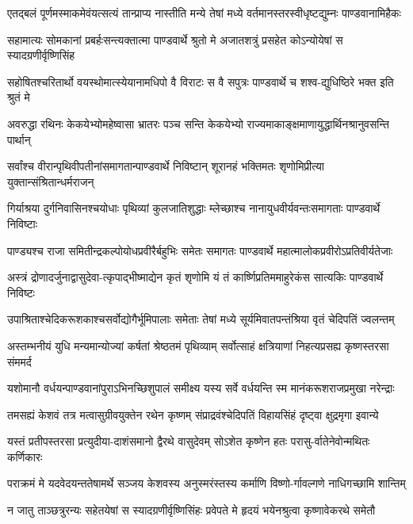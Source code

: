 \twolineshloka
{एतद्बलं पूर्णमस्माकमेवंयत्सत्यं तान्प्राप्य नास्तीति मन्ये}
{तेषां मध्ये वर्तमानस्तरस्वीधृष्टद्युम्नः पाण्डवानामिहैकः}


\twolineshloka
{सहामात्यः सोमकानां प्रबर्हःसन्त्यक्तात्मा पाण्डवार्थे श्रुतो मे}
{अजातशत्रुं प्रसहेत कोऽन्योयेषां स स्यादग्रणीर्वृष्णिसिंह}


\twolineshloka
{सहोषितश्चरितार्थो वयस्थोमात्स्येयानामधिपो वै विराटः}
{स वै सपुत्रः पाण्डवार्थे च शश्व-द्युधिष्ठिरे भक्त इति श्रुतं मे}


\twolineshloka
{अवरुद्धा रथिनः केकयेभ्योमहेष्वासा भ्रातरः पञ्च सन्ति}
{केकयेभ्यो राज्यमाकाङ्क्षमाणायुद्धार्थिनश्रानुवसन्ति पार्थान्}


\twolineshloka
{सर्वांश्च वीरान्पृथिवीपतीनांसमागतान्पाण्डवार्थे निविष्टान्}
{शूरानहं भक्तिमतः शृणोमिप्रीत्या युक्तान्संश्रितान्धर्मराजन्}


\twolineshloka
{गिर्याश्रया दुर्गनिवासिनश्चयोधाः पृथिव्यां कुलजातिशुद्धाः}
{म्लेच्छाश्च नानायुधवीर्यवन्तःसमागताः पाण्डवार्थे निविष्टाः}


\twolineshloka
{पाण्ड्यश्च राजा समितीन्द्रकल्पोयोधप्रवीरैर्बहुभिः समेतः}
{समागतः पाण्डवार्थे महात्मालोकप्रवीरोऽप्रतिवीर्यतेजाः}


\twolineshloka
{अस्त्रं द्रोणादर्जुनाद्वासुदेवा-त्कृपाद्भीष्माद्येन कृतं शृणोमि}
{यं तं कार्ष्णिप्रतिममाहुरेकंस सात्यकिः पाण्डवार्थे निविष्टः}


\twolineshloka
{उपाश्रिताश्चेदिकरूशकाश्चसर्वोद्योगैर्भूमिपालाः समेताः}
{तेषां मध्ये सूर्यमिवातपन्तंश्रिया वृतं चेदिपतिं ज्वलन्तम्}


\twolineshloka
{अस्तम्भनीयं युधि मन्यमान्योज्यां कर्षतां श्रेष्ठतमं पृथिव्याम्}
{सर्वोत्साहं क्षत्रियाणां निहत्यप्रसह्य कृष्णस्तरसा संममर्द}


\twolineshloka
{यशोमानौ वर्धयन्पाण्डवानांपुराऽभिनच्छिशुपालं समीक्ष्य}
{यस्य सर्वे वर्धयन्ति स्म मानंकरूशराजप्रमुखा नरेन्द्राः}


\twolineshloka
{तमसह्यं केशवं तत्र मत्वासुग्रीवयुक्तेन रथेन कृष्णम्}
{संप्राद्रवंश्चेदिपतिं विहायसिंहं दृष्ट्वा क्षुद्रमृगा इवान्ये}


\twolineshloka
{यस्तं प्रतीपस्तरसा प्रत्युदीया-दाशंसमानो द्वैरथे वासुदेवम्}
{सोऽशेत कृष्णेन हतः परासु-र्वातेनेवोन्मथितः कर्णिकारः}


\twolineshloka
{पराक्रमं मे यदवेदयन्ततेषामर्थे सञ्जय केशवस्य}
{अनुस्मरंस्तस्य कर्माणि विष्णो-र्गावल्गणे नाधिगच्छामि शान्तिम्}


\twolineshloka
{न जातु ताञ्छत्रुरन्यः सहेतयेषां स स्यादग्रणीर्वृष्णिसिंहः}
{प्रवेपते मे हृदयं भयेनश्रुत्वा कृष्णावेकरथे समेतौ}


